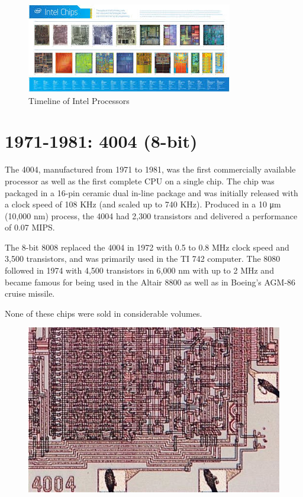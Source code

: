 \begin{figure}[ht!]
	\centering
	\includegraphics[scale=0.5]{media/timeline.jpg}
	\caption{Timeline of Intel Processors}
\end{figure}


\hypertarget{bit}{%
\section{1971-1981: 4004 (8-bit)}\label{bit}}

The 4004, manufactured from 1971 to 1981, was the first commercially
available processor as well as the first complete CPU on a single chip.
The chip was packaged in a 16-pin ceramic dual in-line package and was
initially released with a clock speed of 108 KHz (and scaled up to 740
KHz). Produced in a 10 μm (10,000 nm) process, the 4004 had 2,300
transistors and delivered a performance of 0.07 MIPS.

The 8-bit 8008 replaced the 4004 in 1972 with 0.5 to 0.8 MHz clock speed
and 3,500 transistors, and was primarily used in the TI 742 computer.
The 8080 followed in 1974 with 4,500 transistors in 6,000 nm with up to
2 MHz and became famous for being used in the Altair 8800 as well as in
Boeing's AGM-86 cruise missile.

None of these chips were sold in considerable volumes.

\begin{figure}[h!]
	\centering
	\includegraphics[scale=0.5]{media/image5.jpeg}
\end{figure}



